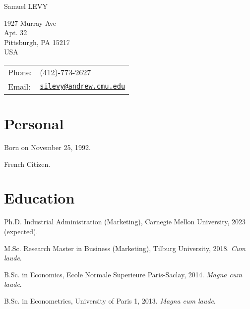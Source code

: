 \documentclass[letterpaper]{article}
\def\name{Samuel LEVY}
\renewenvironment{itemize}{
  \begin{list}{}{
    \setlength{\leftmargin}{1.5em}
  }
}{
  \end{list}
}
\begin{document}
{\huge \name}


\vspace{0.25in}

\begin{minipage}{0.45\linewidth}
  1927 Murray Ave\\
  Apt. 32 \\
  Pittsburgh, PA 15217 \\
  USA
\end{minipage}
\begin{minipage}{0.45\linewidth}
  \begin{tabular}{ll}
    Phone: & (412)-773-2627 \\
    Email: & \href{mailto:silevy@andrew.cmu.edu}{\tt silevy@andrew.cmu.edu} \\
  \end{tabular}
\end{minipage}

\section*{Personal}
\begin{itemize}
\item Born on November 25, 1992.
\item French Citizen.
\end{itemize}

\section*{Education}

\begin{itemize}

  \item Ph.D. Industrial Administration (Marketing), Carnegie Mellon University, 2023 (expected).

  \item M.Sc. Research Master in Business (Marketing), Tilburg University, 2018. \textit{Cum laude}.

  \item B.Sc. in Economics, Ecole Normale Superieure Paris-Saclay, 2014. \textit{Magna cum laude}. 
  
  \item B.Sc. in Econometrics, University of Paris 1, 2013. \textit{Magna cum laude}.


\end{itemize}
\end{document}
